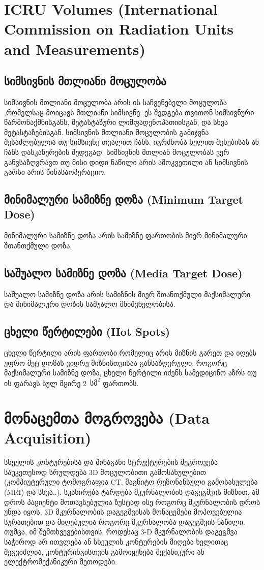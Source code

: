 \documentclass[12pt,a4paper,]{report}
\begin{document}
\chapter{ICRU Volumes (International Commission on Radiation Units and Measurements)}
\section{სიმსივნის მთლიანი მოცულობა}
სიმსივნის მთლიანი მოცულობა არის ის საჩვენებელი მოცულობა ,რომელსაც მოიცავს მთლიანი სიმსივნე. ეს შედგება თვითონ სიმსივნური წარმონაქმნისგანს, მეტასტაზური ლიმფადენოპათიისგან,  და სხვა მეტასტაზებისგან. სიმსივნის მთლიანი მოცულობის გამიჯვნა შესაძლებელია თუ სიმსივნე თვალით ჩანს, იგრძნობა ხელით შეხებისას ან ჩანს დასკანერების შედეგად. სიმსივნის მთლიან მოცულობას ვერ განვსაზღვრავთ თუ მისი დიდი ნაწილი არის ამოკვეთილი ან სიმსივნის გარსი არის წინასაოპერაციო. 


\section{მინიმალური სამიზნე დოზა (Minimum Target Dose)}
მინიმალური სამიზნე დოზა არის სამიზნე ფართობის მიერ მინიმალური შთანთქმული დოზა.

\section{საშუალო სამიზნე დოზა (Media Target Dose)}
საშუალო სამიზნე დოზა არის სამიზნის მიერ შთანთქმული მაქსიმალური და მინიმალური დოზის საშუალო მნიშვნელობისა.  

\section{ცხელი წერტილები (Hot Spots)}
ცხელი წერტილი არის ფართობი რომელიც არის მიზნის გარეთ და იღებს უფრო მეტ დოზას ვიდრე მიზნისთვისაა განსაზღვრული. როგორც მაქსიმალური სამიზნე დოზა, ცხელი წერტილი იძენს სამედიცინო აზრს თუ ის ფარავს სულ მცირე 2~$\text{სმ}^2$ ფართობს.

\chapter{მონაცემთა მოგროვება (Data Acquisition)}
სხეულის კონტურებისა და შინაგანი სტრუქტურების შეგროვება საუკეთესოდ სრულდება 3D მოცულობითი გამოსახულებით (კომპიუტერული ტომოგრაფია CT, მაგნიტო რეზონანსული გამოსახულება (MRI) და სხვა..). სკანირება ტარდება მკურნალობის დაგეგმვის მიზნით, ამ დროს პაციენტი მოთავსებულია ზუსტად ისე როგორც მკურნალობის დროს უნდა იყოს. 3D მკურნალობის დაგეგმვისას მონაცემები მოპოვებულია სურათებით და მიღებულია როგორც მკურნალობა-დაგეგმვის ნაწილი. თუმცა, იმ შემთხვევებისთვის, როდესაც 3-D მკურნალობის დაგეგმვა საჭიროდ არ ითვლება ან სხეულის კონტურების მიღება ხელითაც შეგვიძლია, კონტურინგისთვის გამოიყენება მექანიკური ან ელექტრომექანიკური მეთოდები.
\end{document}
